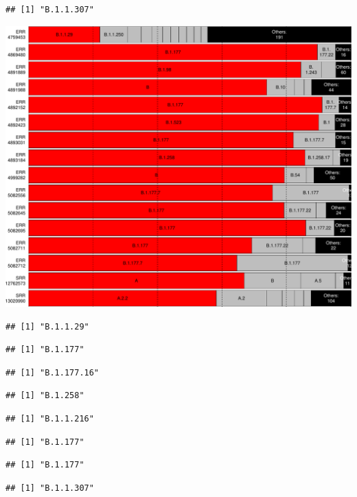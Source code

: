 \documentclass[
]{article}
\begin{document}
\begin{verbatim}
## [1] "B.1.1.307"
\end{verbatim}

\includegraphics{pangolin_results_report_d_files/figure-latex/pareto-1.pdf}

\begin{verbatim}
## [1] "B.1.1.29"
\end{verbatim}

\begin{verbatim}
## [1] "B.1.177"
\end{verbatim}

\begin{verbatim}
## [1] "B.1.177.16"
\end{verbatim}

\begin{verbatim}
## [1] "B.1.258"
\end{verbatim}

\begin{verbatim}
## [1] "B.1.1.216"
\end{verbatim}

\begin{verbatim}
## [1] "B.1.177"
\end{verbatim}

\begin{verbatim}
## [1] "B.1.177"
\end{verbatim}

\begin{verbatim}
## [1] "B.1.1.307"
\end{verbatim}
\end{document}
